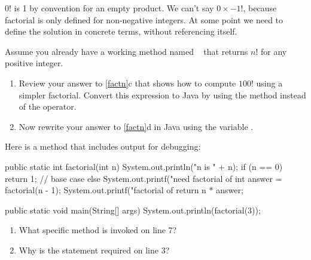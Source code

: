 \begin{answer}
$0!$ is 1 by convention for an empty product.
We can't say $0 \times -1!$, because factorial is only defined for non-negative integers.
At some point we need to define the solution in concrete terms, without referencing itself.
\end{answer}




\Q Assume you already have a working method named ~ that returns $n!$ for any positive integer.

\begin{enumerate}
\item Review your answer to \ref{factn}c that shows how to compute $100!$ using a simpler factorial.
Convert this expression to Java by using the  method instead of the \java{!} operator.


\item Now rewrite your answer to \ref{factn}d in Java using the variable .

\end{enumerate}


\Q \label{factjava}
Here is a  method that includes output for debugging:

\begin{javabox}
public static int factorial(int n) {
    System.out.println("n is " + n);
    if (n == 0) {
        return 1;  // base case
    } else {
        System.out.printf("need factorial of %
        int answer = factorial(n - 1);
        System.out.printf("factorial of %
        return n * answer;
    }
}

public static void main(String[] args) {
    System.out.println(factorial(3));
}
\end{javabox}

\begin{enumerate}
\item What specific method is invoked on line 7?


\item Why is the  statement required on line 3?

\end{enumerate}


